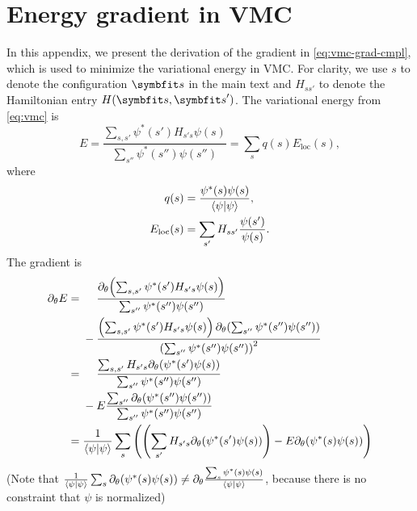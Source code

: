\appendix

\newcommand{\dta}{{\Delta \tau}}
\newcommand{\dth}{{\Delta \theta}}
\newcommand{\evbig}[1]{\big\langle #1 \big\rangle}
\newcommand{\fpsps}[1]{\frac{#1}{\ip{\psi}}}
\newcommand{\pp}{\partial}

\chapter{Energy gradient in VMC}
\label{append:vmc-grad}

In this appendix, we present the derivation of the gradient in \cref{eq:vmc-grad-cmpl}, which is used to minimize the variational energy in VMC. For clarity, we use $s$ to denote the configuration $\vs$ in the main text and $H_{s s'}$ to denote the Hamiltonian entry $H(\vs, \vs')$. The variational energy from \cref{eq:vmc} is
\begin{equation}
E = \frac{\sum_{s, s'} \psi^*(s') H_{s' s} \psi(s)}{\sum_{s''} \psi^*(s'') \psi(s'')}
= \sum_s q(s) E_\text{loc}(s),
\end{equation}
where
\begin{align}
q(s) &= \frac{\psi^*(s) \psi(s)}{\ip{\psi}}, \\
E_\text{loc}(s) &= \sum_{s'} H_{s s'} \frac{\psi(s')}{\psi(s)}.
\end{align}
The gradient is
\begin{align}
\pp_\theta E &= \phantom{{}-{}}\frac{\pp_\theta\!\left( \sum_{s, s'} \psi^*(s') H_{s' s} \psi(s) \right)}{\sum_{s''} \psi^*(s'') \psi(s'')} \nonumber \\
&\phantom{{}={}}- \frac{\left( \sum_{s, s'} \psi^*(s') H_{s' s} \psi(s) \right) \pp_\theta\!\left( \sum_{s''} \psi^*(s'') \psi(s'') \right)}{\left( \sum_{s''} \psi^*(s'') \psi(s'') \right)^2} \\
&= \phantom{{}-{}}\frac{\sum_{s, s'} H_{s' s} \pp_\theta\!\left( \psi^*(s') \psi(s) \right)}{\sum_{s''} \psi^*(s'') \psi(s'')} \nonumber \\
&\phantom{{}={}}- E \frac{\sum_{s''} \pp_\theta\!\left( \psi^*(s'') \psi(s'') \right)}{\sum_{s''} \psi^*(s'') \psi(s'')} \\
&= \frac{1}{\ip{\psi}} \sum_s \left( \left( \sum_{s'} H_{s' s} \pp_\theta\!\left( \psi^*(s') \psi(s) \right) \right) - E \pp_\theta\!\left( \psi^*(s) \psi(s) \right) \right)
\end{align}
(Note that $\frac{1}{\ip{\psi}} \sum_s \pp_\theta\!\left( \psi^*(s) \psi(s) \right) \neq \pp_\theta \frac{\sum_s \psi^*(s) \psi(s)}{\ip{\psi}}$, because there is no constraint that $\psi$ is normalized)

